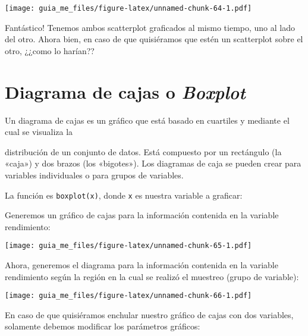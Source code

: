 \documentclass[]{book}
\newenvironment{Shaded}{\begin{snugshade}}{\end{snugshade}}
\newcommand{\KeywordTok}[1]{\textcolor[rgb]{0.13,0.29,0.53}{\textbf{#1}}}
\newcommand{\NormalTok}[1]{#1}
\newcommand{\OperatorTok}[1]{\textcolor[rgb]{0.81,0.36,0.00}{\textbf{#1}}}
\newcommand{\StringTok}[1]{\textcolor[rgb]{0.31,0.60,0.02}{#1}}
\begin{document}
\texttt{[image: guia\_me\_files/figure-latex/unnamed-chunk-64-1.pdf]}

Fantástico! Tenemos ambos scatterplot graficados al mismo tiempo, uno al lado del otro. Ahora bien, en
caso de que quisiéramos que estén un scatterplot sobre el otro, ¿¿como lo harían??

\hypertarget{diagrama-de-cajas-o-boxplot}{%
\section{\texorpdfstring{Diagrama de cajas o \emph{Boxplot}}{Diagrama de cajas o Boxplot}}\label{diagrama-de-cajas-o-boxplot}}

Un diagrama de cajas es un gráfico que está basado en cuartiles y mediante el cual se visualiza la

distribución de un conjunto de datos. Está compuesto por un rectángulo (la «caja») y dos brazos (los
«bigotes»). Los diagramas de caja se pueden crear para variables individuales o para grupos de variables.

La función es \texttt{boxplot(x)}, donde \texttt{x} es nuestra variable a graficar:

Generemos un gráfico de cajas para la información contenida en la variable rendimiento:

\begin{Shaded}
\end{Shaded}

\texttt{[image: guia\_me\_files/figure-latex/unnamed-chunk-65-1.pdf]}

Ahora, generemos el diagrama para la información contenida en la variable rendimiento según la región en la
cual se realizó el muestreo (grupo de variable):

\begin{Shaded}
\end{Shaded}

\texttt{[image: guia\_me\_files/figure-latex/unnamed-chunk-66-1.pdf]}

En caso de que quisiéramos enchular nuestro gráfico de cajas con dos variables, solamente debemos
modificar los parámetros gráficos:
\end{document}
